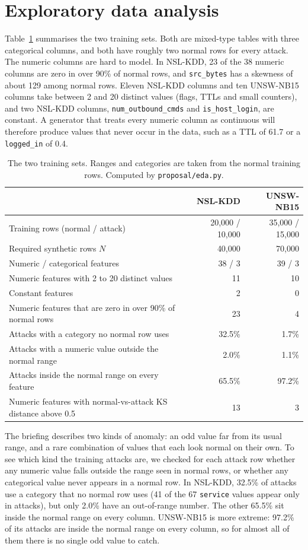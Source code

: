 \documentclass[11pt,a4paper]{article}
\newcommand{\col}[1]{\texttt{#1}}
\begin{document}
\section{Exploratory data analysis}
\label{sec:eda}

Table~\ref{tab:data} summarises the two training sets. Both are mixed-type tables with three categorical columns, and both have roughly two normal rows for every attack. The numeric columns are hard to model. In NSL-KDD, 23 of the 38 numeric columns are zero in over 90\% of normal rows, and \col{src\_bytes} has a skewness of about 129 among normal rows. Eleven NSL-KDD columns and ten UNSW-NB15 columns take between 2 and 20 distinct values (flags, TTLs and small counters), and two NSL-KDD columns, \col{num\_outbound\_cmds} and \col{is\_host\_login}, are constant. A generator that treats every numeric column as continuous will therefore produce values that never occur in the data, such as a TTL of 61.7 or a \col{logged\_in} of 0.4.

\begin{table}[htb]
\centering
\small
\caption{The two training sets. Ranges and categories are taken from the normal training rows. Computed by \col{proposal/eda.py}.}
\label{tab:data}
\begin{tabular}{lrr}
\toprule
 & NSL-KDD & UNSW-NB15 \\
\midrule
Training rows (normal / attack) & 20,000 / 10,000 & 35,000 / 15,000 \\
Required synthetic rows $N$ & 40,000 & 70,000 \\
Numeric / categorical features & 38 / 3 & 39 / 3 \\
Numeric features with 2 to 20 distinct values & 11 & 10 \\
Constant features & 2 & 0 \\
Numeric features that are zero in over 90\% of normal rows & 23 & 4 \\
\midrule
Attacks with a category no normal row uses & 32.5\% & 1.7\% \\
Attacks with a numeric value outside the normal range & 2.0\% & 1.1\% \\
Attacks inside the normal range on every feature & 65.5\% & 97.2\% \\
Numeric features with normal-vs-attack KS distance above 0.5 & 13 & 3 \\
\bottomrule
\end{tabular}
\end{table}

The briefing describes two kinds of anomaly: an odd value far from its usual range, and a rare combination of values that each look normal on their own. To see which kind the training attacks are, we checked for each attack row whether any numeric value falls outside the range seen in normal rows, or whether any categorical value never appears in a normal row. In NSL-KDD, 32.5\% of attacks use a category that no normal row uses (41 of the 67 \col{service} values appear only in attacks), but only 2.0\% have an out-of-range number. The other 65.5\% sit inside the normal range on every column. UNSW-NB15 is more extreme: 97.2\% of its attacks are inside the normal range on every column, so for almost all of them there is no single odd value to catch.
\end{document}
